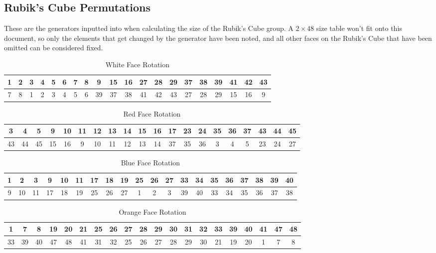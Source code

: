 \documentclass[10pt,a4paper,notitlepage]{article}
\begin{document}
\subsection*{\centering Rubik's Cube Permutations}\label{perms}
These are the generators inputted into  when calculating the size of the Rubik's Cube group. A $2 \times 48$ size table won't fit onto this document, so only the elements that get changed by the generator have been noted, and all other faces on the Rubik's Cube that have been omitted can be considered fixed.
\begin{table}[H]
\centering
\begin{tabular}{|cccccccccccccccccccc|} \hline
1 & 2 & 3 & 4 & 5 & 6 & 7 & 8 & 9 & 15 & 16 & 27 & 28 & 29 & 37 & 38 & 39 & 41 & 42 & 43\\ \hline7 & 8 & 1 & 2 & 3 & 4 & 5 & 6 & 39 & 37 & 38 & 41 & 42 & 43 & 27 & 28 & 29 & 15 & 16 & 9\\ \hline 
\end{tabular}
\caption{White Face Rotation}
\end{table}
\begin{table}[H]
\centering
\begin{tabular}{|cccccccccccccccccccc|} \hline
3&4&5&9&10&11&12&13&14&15&16&17&23&24&35&36&37&43&44&45\\ \hline 43&44&45&15&16&9&10&11&12&13&14&37&35&36&3&4&5&23&24&27\\ \hline 
\end{tabular}
\caption{Red Face Rotation}
\end{table}
\begin{table}[H]
\centering
\begin{tabular}{|cccccccccccccccccccc|} \hline
1&2&3&9&10&11&17&18&19&25&26&27&33&34&35&36&37&38&39&40\\ \hline 9&10&11&17&18&19&25&26&27&1&2&3&39&40&33&34&35&36&37&38\\ \hline 
\end{tabular}
\caption{Blue Face Rotation}
\end{table}
\begin{table}[H]
\centering
\begin{tabular}{|cccccccccccccccccccc|} \hline
1&7&8&19&20&21&25&26&27&28&29&30&31&32&33&39&40&41&47&48\\ \hline 33&39&40&47&48&41&31&32&25&26&27&28&29&30&21&19&20&1&7&8\\ \hline 
\end{tabular}
\caption{Orange Face Rotation}
\end{table}
\end{document}
